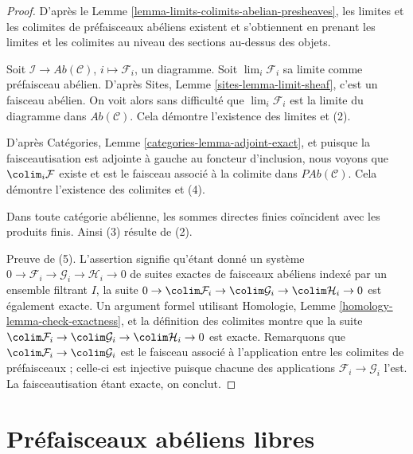 \begin{proof}
D'après le Lemme \ref{lemma-limits-colimits-abelian-presheaves}, les limites et
les colimites de préfaisceaux abéliens existent et s'obtiennent en prenant les
limites et les colimites au niveau des sections au-dessus des objets.

\medskip\noindent
Soit $\mathcal{I} \to \textit{Ab}(\mathcal{C})$,
$i \mapsto \mathcal{F}_i$, un diagramme. Soit $\lim_i \mathcal{F}_i$ sa
limite comme préfaisceau abélien. D'après Sites, Lemme
\ref{sites-lemma-limit-sheaf}, c'est un faisceau abélien. On voit alors sans
difficulté que $\lim_i \mathcal{F}_i$ est la limite du diagramme dans
$\textit{Ab}(\mathcal{C})$. Cela démontre l'existence des limites et (2).

\medskip\noindent
D'après Catégories, Lemme \ref{categories-lemma-adjoint-exact}, et puisque la
faisceautisation est adjointe à gauche au foncteur d'inclusion, nous voyons que
$\colim_i \mathcal{F}$ existe et est le faisceau associé à la colimite dans
$\textit{PAb}(\mathcal{C})$. Cela démontre l'existence des colimites et (4).

\medskip\noindent
Dans toute catégorie abélienne, les sommes directes finies coïncident avec les
produits finis. Ainsi (3) résulte de (2).

\medskip\noindent
Preuve de (5). L'assertion signifie qu'étant donné un système
$0 \to \mathcal{F}_i \to \mathcal{G}_i \to \mathcal{H}_i \to 0$
de suites exactes de faisceaux abéliens indexé par un ensemble filtrant $I$, la
suite
$0 \to \colim \mathcal{F}_i \to \colim \mathcal{G}_i \to
\colim \mathcal{H}_i \to 0$ est également exacte. Un argument formel utilisant
Homologie, Lemme \ref{homology-lemma-check-exactness}, et la définition des
colimites montre que la suite
$\colim \mathcal{F}_i \to \colim \mathcal{G}_i \to \colim \mathcal{H}_i \to 0$
est exacte. Remarquons que
$\colim \mathcal{F}_i \to \colim \mathcal{G}_i$ est le faisceau associé à
l'application entre les colimites de préfaisceaux ; celle-ci est injective
puisque chacune des applications
$\mathcal{F}_i \to \mathcal{G}_i$ l'est. La faisceautisation étant exacte, on
conclut.
\end{proof}







\section{Préfaisceaux abéliens libres}
\label{section-free-abelian-presheaf}

